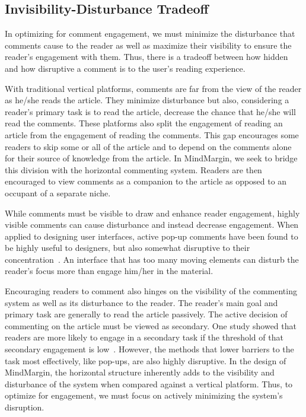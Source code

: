 \subsection{Invisibility-Disturbance Tradeoff}
In optimizing for comment engagement, we must minimize the disturbance that comments cause to the reader as well as maximize their visibility to ensure the reader’s engagement with them. Thus, there is a tradeoff between how hidden and how disruptive a comment is to the user’s reading experience. 

With traditional vertical platforms, comments are far from the view of the reader as he/she reads the article. They minimize disturbance but also, considering a reader’s primary task is to read the article, decrease the chance that he/she will read the comments. These platforms also split the engagement of reading an article from the engagement of reading the comments. This gap encourages some readers to skip some or all of the article and to depend on the comments alone for their source of knowledge from the article. In MindMargin, we seek to bridge this division with the horizontal commenting system. Readers are then encouraged to view comments as a companion to the article as opposed to an occupant of a separate niche.

While comments must be visible to draw and enhance reader engagement, highly visible comments can cause disturbance and instead decrease engagement. When applied to designing user interfaces, active pop-up comments have been found to be highly useful to designers, but also somewhat disruptive to their concentration~\cite{CommentingSystems}. An interface that has too many moving elements can disturb the reader's focus more than engage him/her in the material. 

Encouraging readers to comment also hinges on the visibility of the commenting system as well as its disturbance to the reader. The reader’s main goal and primary task are generally to read the article passively. The active decision of commenting on the article must be viewed as secondary. One study showed that readers are more likely to engage in a secondary task if the threshold of that secondary engagement is low~\cite{Wikipedia}. However, the methods that lower barriers to the task most effectively, like pop-ups, are also highly disruptive. In the design of MindMargin, the horizontal structure inherently adds to the visibility and disturbance of the system when compared against a vertical platform. Thus, to optimize for engagement, we must focus on actively minimizing the system’s disruption.